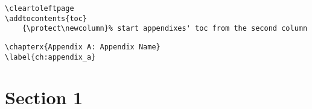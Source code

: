 \documentclass[itdr]{subfiles}
\begin{document}
{}%

\label{ch:appendix_a}

\begin{lstlisting}
\cleartoleftpage
\addtocontents{toc}
	{\protect\newcolumn}% start appendixes' toc from the second column
\end{lstlisting}

\begin{lstlisting}
\chapterx{Appendix A: Appendix Name}
\label{ch:appendix_a}
\end{lstlisting}

\section{Section 1}

\lipsum[1]
\end{document}
